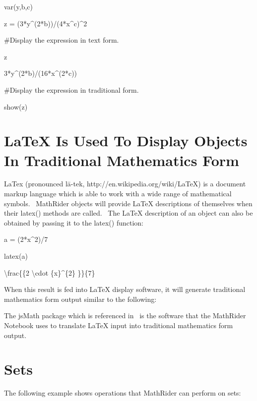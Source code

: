 \documentclass[12pt,twoside]{book}
\begin{document}
\bigskip

var({\textquotesingle}y,b,c{\textquotesingle})

z = (3*y\^{}(2*b))/(4*x\^{}c)\^{}2


\bigskip

\#Display the expression in text form.

z

{\textbar}

3*y\^{}(2*b)/(16*x\^{}(2*c))

\#Display the expression in traditional form.

show(z)

{\textbar}


\bigskip

 


\bigskip

\section[LaTeX Is Used To Display Objects In Traditional
Mathematics Form]{LaTeX Is Used To Display Objects In
Traditional Mathematics Form}
LaTex (pronounced l\=a{}-tek, http://en.wikipedia.org/wiki/LaTeX) is a
document markup language which is able to work with a wide range of
mathematical symbols. \ MathRider objects will provide LaTeX
descriptions of themselves when their latex() methods are called. \ The
LaTeX description of an object can also be obtained by passing it to
the latex() function:


\bigskip

a = (2*x\^{}2)/7

latex(a)

{\textbar}

{\textbackslash}frac\{\{2 {\textbackslash}cdot \{x\}\^{}\{2\} \}\}\{7\}

When this result is fed into LaTeX display software, it will generate
traditional mathematics form output similar to the following:


\bigskip


\bigskip


\bigskip

The jsMath package which is referenced in \ is the software that the
MathRider Notebook uses to translate LaTeX input into traditional
mathematics form output.

\section[Sets]{Sets}
The following example shows operations that MathRider can perform on
sets:
\end{document}

